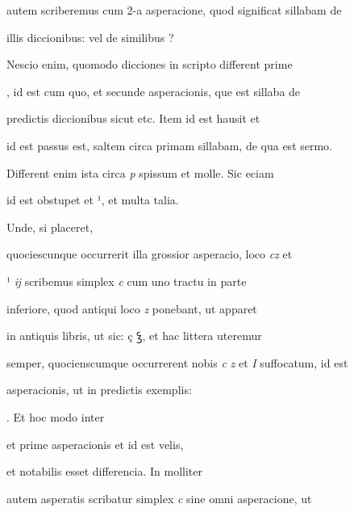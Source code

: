 autem scriberemus  cum 2-a asperacione, quod significat sillabam de

illis diccionibus:    vel de similibus ?

Nescio enim, quomodo dicciones in scripto different  prime 

, id est cum quo, et  secunde asperacionis, que est sillaba de

predictis diccionibus sicut  etc. Item  id est hausit et

 id est passus est, saltem circa primam sillabam, de qua est sermo.

Different enim ista circa \textit{p} spissum et molle. Sic eciam 

\splitlines

id est obstupet et ¹, et multa talia.

\indentK Unde, si placeret,

\fulllines

quociescunque occurrerit illa grossior asperacio,  loco \textit{cz} et

¹ \textit{ĳ} scribemus simplex \textit{c} cum uno tractu in parte

inferiore, quod antiqui loco \textit{z} ponebant, ut apparet

in antiquis libris, ut sic: ç {\Quivira ꝣ}, et hac littera uteremur

semper, quocienscumque occurrerent nobis \textit{c} \textit{z} et \textit{I} suffocatum, id est 

 asperacionis, ut in predictis exemplis:  

    . Et hoc modo inter 

et  prime asperacionis et  id est velis, 

 et  notabilis esset differencia. In molliter

autem asperatis scribatur simplex \textit{c} sine omni asperacione, ut

